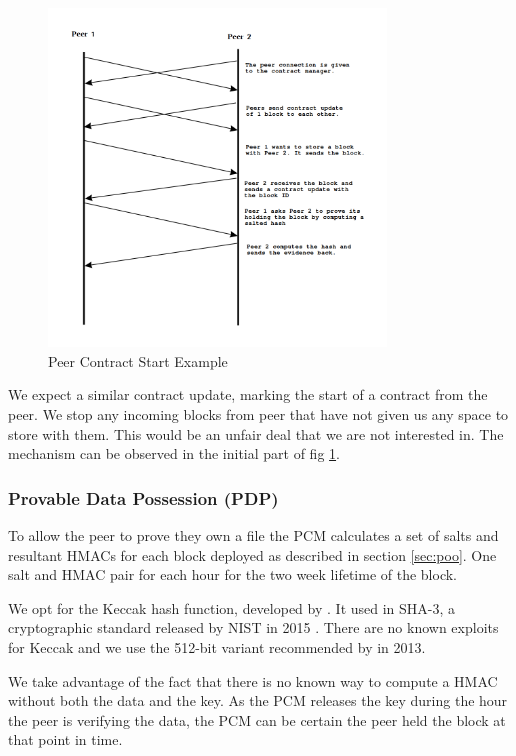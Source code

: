 \documentclass[11pt, a4paper, twoside]{report}
\begin{document}
\begin{figure}[h]
 \centering
 \includegraphics[width=0.8\textwidth]{contract-start}
 \caption{Peer Contract Start Example}
 \label{fig:contract-start}
\end{figure}

We expect a similar contract update, marking the start of a contract from the peer. We stop any incoming blocks from peer that have not given us any space to store with them. This would be an unfair deal that we are not interested in. The mechanism can be observed in the initial part of fig \ref{fig:contract-start}.

\subsubsection{Provable Data Possession (PDP)} \label{sec:pdp}

To allow the peer to prove they own a file the PCM calculates a set of salts and resultant HMACs for each block deployed as described in section \ref{sec:poo}. One salt and HMAC pair for each hour for the two week lifetime of the block.

We opt for the Keccak hash function, developed by \cite{bertoni2009keccak}. It used in SHA-3, a cryptographic standard released by NIST in 2015 \citep{paul2015nist}. There are no known exploits for Keccak and we use the 512-bit variant recommended by \cite{bertoni2009keccak} in 2013.

We take advantage of the fact that there is no known way to compute a HMAC without both the data and the key. As the PCM releases the key during the hour the peer is verifying the data, the PCM can be certain the peer held the block at that point in time. \citep{ateniese2011remote}
\end{document}
